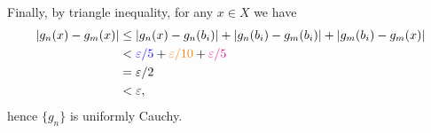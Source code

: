 \begin{enumerate}
\begin{pf}
Finally, by triangle inequality, for any \(x\in X\) we have
\begin{align*}
|g_n(x)-g_m(x)|&\le |g_n(x)-g_n(b_i)|+|g_n(b_i)-g_m(b_i)|+|g_m(b_i)-g_m(x)| \\
&<{\color{blue}\varepsilon/5}+{\color{orange}\varepsilon/10}+{\color{magenta}\varepsilon/5} \\
&=\varepsilon/2 \\
&<\varepsilon,
\end{align*}
hence \(\{g_n\}\) is uniformly Cauchy.
\end{pf}
\end{enumerate}
